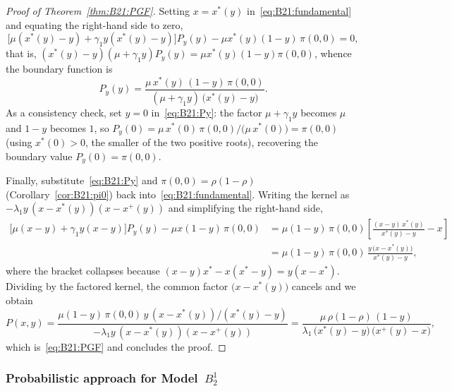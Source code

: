 \begin{proof}[Proof of Theorem~\ref{thm:B21:PGF}]
Setting $x=x^*(y)$ in~\eqref{eq:B21:fundamental} and equating the right-hand side to zero,
\begin{equation*}
    \bigl[\mu(x^*(y)-y) + \gamma_1 y(x^*(y)-y)\bigr]P_y(y) - \mu x^*(y)(1-y)\,\pi(0,0) = 0,
\end{equation*}
that is, $(x^*(y)-y)(\mu+\gamma_1 y)P_y(y) = \mu x^*(y)(1-y)\pi(0,0)$, whence the boundary
function is
\begin{equation}
    P_y(y) = \frac{\mu\,x^*(y)\,(1-y)\,\pi(0,0)}
                  {(\mu+\gamma_1 y)\,\bigl(x^*(y)-y\bigr)}.
    \label{eq:B21:Py}
\end{equation}
As a consistency check, set $y=0$ in~\eqref{eq:B21:Py}: the factor $\mu+\gamma_1 y$ becomes
$\mu$ and $1-y$ becomes $1$, so
$P_y(0)=\mu\,x^*(0)\,\pi(0,0)/\bigl(\mu\,x^*(0)\bigr)=\pi(0,0)$ (using $x^*(0)>0$, the
smaller of the two positive roots), recovering the boundary value $P_y(0)=\pi(0,0)$.

Finally, substitute~\eqref{eq:B21:Py} and $\pi(0,0)=\rho(1-\rho)$
(Corollary~\ref{cor:B21:pi0}) back into~\eqref{eq:B21:fundamental}. Writing the kernel as
$-\lambda_1 y\,(x-x^*(y))(x-x^+(y))$ and simplifying the right-hand side,
\begin{align*}
    \bigl[\mu(x-y)+\gamma_1 y(x-y)\bigr]P_y(y) - \mu x(1-y)\,\pi(0,0)
    &= \mu(1-y)\,\pi(0,0)\left[\frac{(x-y)\,x^*(y)}{x^*(y)-y}-x\right] \\
    &= \mu(1-y)\,\pi(0,0)\,\frac{y\,\bigl(x-x^*(y)\bigr)}{x^*(y)-y},
\end{align*}
where the bracket collapses because
$(x-y)x^*-x(x^*-y)=y(x-x^*)$. Dividing by the factored kernel, the common factor
$\bigl(x-x^*(y)\bigr)$ cancels and we obtain
\begin{equation*}
    P(x,y) = \frac{\mu(1-y)\,\pi(0,0)\,y\,(x-x^*(y))/(x^*(y)-y)}
                  {-\lambda_1 y\,(x-x^*(y))(x-x^+(y))}
           = \frac{\mu\,\rho(1-\rho)\,(1-y)}
                  {\lambda_1\,\bigl(x^*(y)-y\bigr)\,\bigl(x^+(y)-x\bigr)},
\end{equation*}
which is~\eqref{eq:B21:PGF} and concludes the proof.
\end{proof}

\subsubsection{Probabilistic approach for Model~\texorpdfstring{$B_2^1$}{B21}}\label{sssec:B21:probabilistic}

